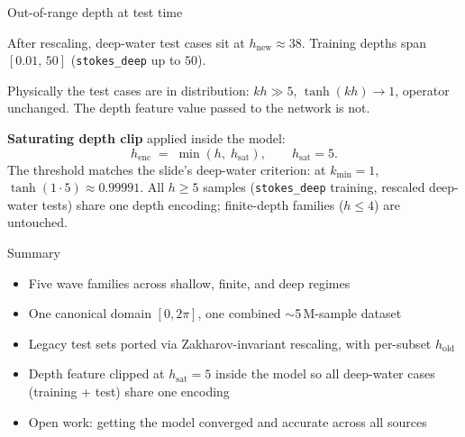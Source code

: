 \documentclass[aspectratio=169,11pt]{beamer}
\begin{document}
\begin{frame}{Out-of-range depth at test time}

After rescaling, deep-water test cases sit at $h_{\text{new}} \approx 38$.
Training depths span $[0.01,\,50]$ (\texttt{stokes\_deep} up to $50$).

\pause
Physically the test cases are in distribution: $kh \gg 5$, $\tanh(kh) \to 1$,
operator unchanged. The depth feature value passed to the network is not.

\pause
\textbf{Saturating depth clip} applied inside the model:
\[
  h_{\text{enc}} \;=\; \min(h,\; h_{\text{sat}}), \qquad h_{\text{sat}} = 5.
\]
The threshold matches the slide's deep-water criterion: at $k_{\min} = 1$,
$\tanh(1 \cdot 5) \approx 0.99991$. All $h \ge 5$ samples
(\texttt{stokes\_deep} training, rescaled deep-water tests) share one
depth encoding; finite-depth families ($h \le 4$) are untouched.
\end{frame}

\begin{frame}{Summary}

\begin{itemize}
  \item Five wave families across shallow, finite, and deep regimes
  \item One canonical domain $[0, 2\pi]$, one combined $\sim$5\,M-sample dataset
  \item Legacy test sets ported via Zakharov-invariant rescaling, with
        per-subset $h_{\text{old}}$
  \item Depth feature clipped at $h_{\text{sat}} = 5$ inside the model so
        all deep-water cases (training + test) share one encoding
  \item Open work: getting the model converged and accurate across all sources
\end{itemize}
\end{frame}
\end{document}
